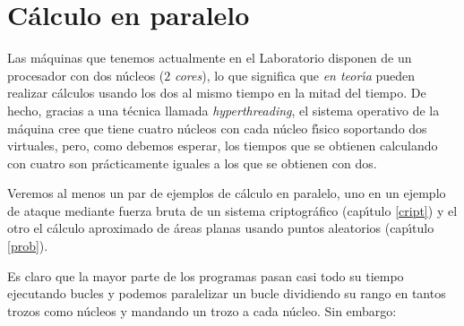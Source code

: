 \section{C\'alculo en paralelo}
Las m\'aquinas que tenemos actualmente en el Laboratorio disponen de un
procesador con dos n\'ucleos ($2$ {\itshape cores}), lo que significa que
{\itshape
en teor\'{\i}a} pueden realizar c\'alculos usando los dos al mismo tiempo en
la mitad del tiempo. De hecho, gracias a una t\'ecnica llamada {\itshape
hyperthreading},  el sistema operativo de la m\'aquina cree que tiene cuatro
n\'ucleos con cada n\'ucleo f\'{\i}sico soportando dos virtuales, pero, como
debemos esperar,  los tiempos que se obtienen calculando con cuatro son
pr\'acticamente iguales a los que se obtienen con dos.

Veremos al menos un par de ejemplos de c\'alculo en paralelo, uno en un ejemplo
de ataque mediante fuerza bruta de un sistema criptogr\'afico (cap\'{\i}tulo
\ref{cript})  y el otro el c\'alculo aproximado de \'areas planas usando puntos
aleatorios (cap\'{\i}tulo \ref{prob}). 






Es claro que la mayor parte de los programas pasan casi todo su tiempo
ejecutando bucles y podemos paralelizar un bucle dividiendo su rango
en tantos trozos como n\'ucleos  y mandando un trozo a cada n\'ucleo. Sin
embargo:

